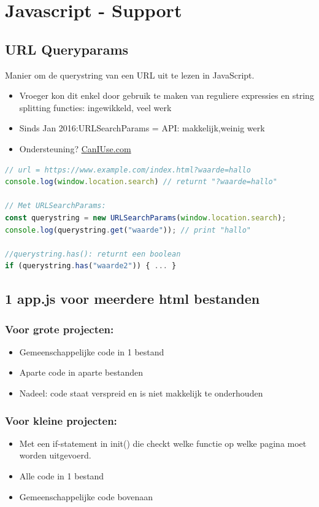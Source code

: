 \documentclass{article}
\begin{document}
\section{Javascript - Support}
\subsection{URL Queryparams}
Manier om de querystring van een URL uit te lezen in JavaScript.

\begin{itemize}
    \item Vroeger kon dit enkel door gebruik te maken van reguliere expressies en string splitting functies: ingewikkeld, veel werk 
    \item Sinds Jan 2016:URLSearchParams = API: makkelijk,weinig werk
    \item Ondersteuning? \url{CanIUse.com}
\end{itemize}

\begin{lstlisting}[language=JavaScript]
// url = https://www.example.com/index.html?waarde=hallo
console.log(window.location.search) // returnt "?waarde=hallo"

// Met URLSearchParams:
const querystring = new URLSearchParams(window.location.search);
console.log(querystring.get("waarde")); // print "hallo"

//querystring.has(): returnt een boolean
if (querystring.has("waarde2")) { ... } 
\end{lstlisting}


\subsection{1 app.js voor meerdere html bestanden}
\subsubsection{Voor grote projecten:}
\begin{itemize}
    \item Gemeenschappelijke code in 1 bestand
    \item Aparte code in aparte bestanden
    \item Nadeel: code staat verspreid en is niet makkelijk te onderhouden
\end{itemize}

\subsubsection{Voor kleine projecten:}
\begin{itemize}
    \item Met een if-statement in init() die checkt welke functie op welke pagina moet worden uitgevoerd.
    \item Alle code in 1 bestand
    \item Gemeenschappelijke code bovenaan
\end{itemize}
\end{document}
